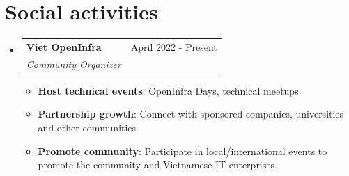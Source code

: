 \documentclass[letterpaper,11pt]{article}
\makeatletter
\newcommand{\resumeItem}[2]{
  \item\small{
    \textbf{#1}{: #2 \vspace{-2pt}}
  }
}
\newcommand{\resumeItemNornal}[1]{
  \item\small{
    {#1 \vspace{-2pt}}
  }
}
\newcommand{\resumeSubheading}[4]{
  \vspace{-1pt}
  \item
    \begin{tabular*}{0.97\textwidth}{l@{\extracolsep{\fill}}r}
      \textbf{#1} & #2 \\
      \textit{\small#3} & \textit{\small #4} \\
    \end{tabular*}\vspace{-5pt}
}
\newcommand{\resumeSubItemNormal}[1]{\resumeItemNornal{#1}\vspace{-4pt}}
\newcommand{\resumeSubHeadingListStart}{\begin{itemize}[leftmargin=*]}
\newcommand{\resumeSubHeadingListEnd}{\end{itemize}}
\newcommand{\resumeItemListStart}{\begin{itemize}}
\newcommand{\resumeItemListEnd}{\end{itemize}\vspace{-5pt}}
\makeatother
\begin{document}


\section{Social activities}
\resumeSubHeadingListStart

    \resumeSubheading
      {Viet OpenInfra}{April 2022 - Present}
      {Community Organizer}{}
      \resumeItemListStart
        \resumeItem{Host technical events}
        {OpenInfra Days, technical meetups}
        \resumeItem{Partnership growth}
        {Connect with sponsored companies, universities and other communities.} 
        \resumeItem{Promote community}
        {Participate in local/international events to promote the community and Vietnamese IT enterprises.} 
      \resumeItemListEnd

  \resumeSubHeadingListEnd



\end{document}
